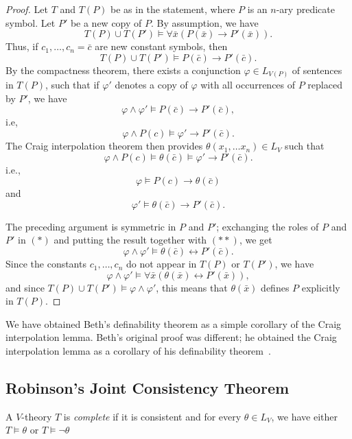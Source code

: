 \documentclass{scrartcl}
\renewcommand{\phi}{\varphi}
\begin{document}
\begin{proof}
Let $T$ and $T(P)$ be as in the statement, where $P$ is an $n$-ary predicate symbol. Let $P'$ be a new copy of $P$. By assumption, we have
\[
T(P)\cup T(P')\models 
\forall\bar{x}(P(\bar{x})\to P'(\bar{x})).
\] 
Thus, if $c_1,\dots, c_n=\bar{c}$ are new constant symbols, then
\[
T(P)\cup T(P')\models 
P(\bar{c})\to P'(\bar{c}).
\] 
By the compactness theorem,  there exists a conjunction $\phi\in L_{V(P)}$ of sentences in $T(P)$, such that if $\phi'$ denotes a copy of  $\phi$ with all occurrences of $P$ replaced by $P'$, we have 
\[
\phi\land\phi'\models 
P(\bar{c})\to P'(\bar{c}),
\] 
i.e, 
\[
\phi\land P(c)\models
\phi' \to P'(\bar{c}).
\]
The Craig interpolation theorem then provides $\theta(x_1,\dots x_n)\in L_V$ such that
\[
\phi\land P(c)\models \theta(\bar c) \models \phi' \to P'(\bar{c}).
\]
i.e., 
\[
\tag{*}
\phi \models P(c)\to \theta(\bar c) 
\]
and
\[
\tag{**}
\phi' \models \theta(\bar c) \to P'(\bar{c}).
\]

 The preceding argument is symmetric in $P$ and $P'$; exchanging the roles of $P$ and $P'$ in $(*)$ and putting the result together with $(**)$, we get 
 \[
\phi \land \phi' \models
\theta (\bar c)  \leftrightarrow P'(\bar{c}).
\]
Since the constants $c_1,\dots, c_n$ do not appear in $T(P)$ or $T(P')$, we have
 \[
\phi \land \phi' \models
\forall \bar x (\theta (\bar x)  \leftrightarrow P'(\bar{x})),
\]
and since $T(P)\cup T(P')\models \phi \land \phi'$, this means that $\theta(\bar x)$ defines $P$ explicitly in $T(P)$.
\end{proof}

\begin{history}
We have obtained Beth's definability theorem as a simple corollary of the Craig interpolation lemma. Beth's original proof was different; he obtained the Craig interpolation lemma as a corollary of his definability theorem~\cite{Beth:1953}.
\end{history}

\subsection{Robinson's Joint Consistency Theorem}

\begin{definition}
\label{D:complete theory}
A $V$-theory $T$ is \emph{complete} if it is consistent and for every $\theta\in L_V$, we have either $T\models \theta$ or $T\models\neg\theta$ 
\end{definition}
\end{document}
